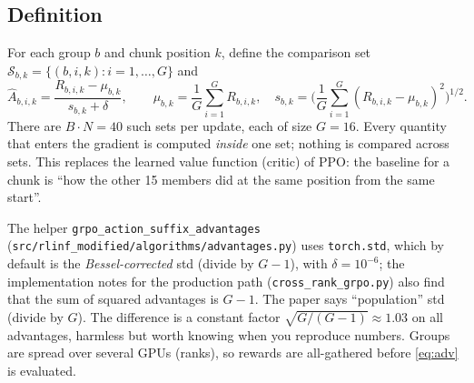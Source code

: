 \documentclass[11pt,a4paper]{article}
\newcommand{\Ah}{\hat A}
\theoremstyle{remark}
\begin{document}
\subsection{Definition}
For each group $b$ and chunk position $k$, define the comparison set $\mathcal S_{b,k}=\{(b,i,k):i=1,\dots,G\}$ and
\begin{equation}
\Ah_{b,i,k}=\frac{R_{b,i,k}-\mu_{b,k}}{s_{b,k}+\delta},\qquad
\mu_{b,k}=\frac1G\sum_{i=1}^{G}R_{b,i,k},\quad
s_{b,k}=\Big(\frac1G\sum_{i=1}^{G}(R_{b,i,k}-\mu_{b,k})^2\Big)^{1/2}.
\label{eq:adv}
\end{equation}
There are $B\cdot N=40$ such sets per update, each of size $G=16$. Every quantity that enters the gradient is computed \emph{inside} one set; nothing is compared across sets. This replaces the learned value function (critic) of PPO: the baseline for a chunk is ``how the other 15 members did at the same position from the same start''.

\begin{codenote}[(advantages)]
The helper \texttt{grpo\_action\_suffix\_advantages} (\texttt{src/rlinf\_modified/algorithms/advantages.py}) uses \texttt{torch.std}, which by default is the \emph{Bessel-corrected} std (divide by $G-1$), with $\delta=10^{-6}$; the implementation notes for the production path (\texttt{cross\_rank\_grpo.py}) also find that the sum of squared advantages is $G-1$. The paper says ``population'' std (divide by $G$). The difference is a constant factor $\sqrt{G/(G-1)}\approx1.03$ on all advantages, harmless but worth knowing when you reproduce numbers. Groups are spread over several GPUs (ranks), so rewards are all-gathered before \eqref{eq:adv} is evaluated.
\end{codenote}
\end{document}
